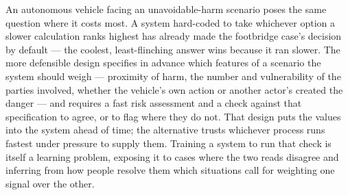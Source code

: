 An autonomous vehicle facing an unavoidable-harm scenario poses the same question where it costs most. A system hard-coded to take whichever option a slower calculation ranks highest has already made the footbridge case's decision by default — the coolest, least-flinching answer wins because it ran slower. The more defensible design specifies in advance which features of a scenario the system should weigh — proximity of harm, the number and vulnerability of the parties involved, whether the vehicle's own action or another actor's created the danger — and requires a fast risk assessment and a check against that specification to agree, or to flag where they do not. That design puts the values into the system ahead of time; the alternative trusts whichever process runs fastest under pressure to supply them. Training a system to run that check is itself a learning problem, exposing it to cases where the two reads disagree and inferring from how people resolve them which situations call for weighting one signal over the other.
